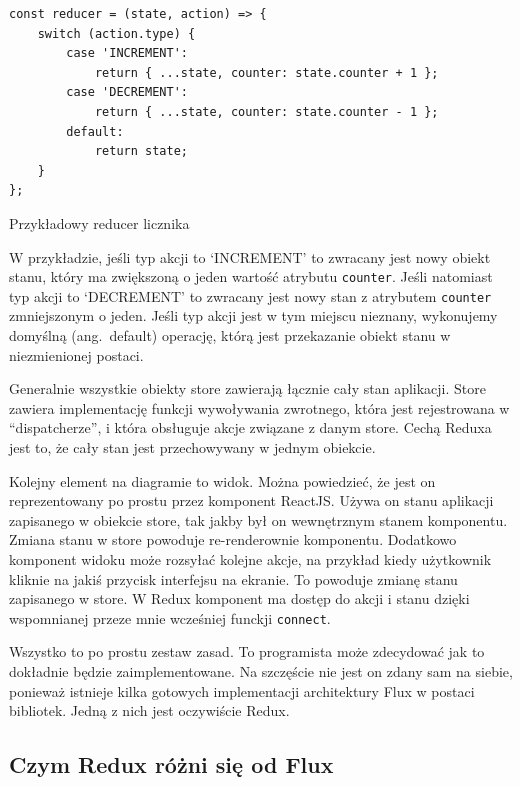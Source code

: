 \begin{listing}
\begin{verbatim}
const reducer = (state, action) => {
    switch (action.type) {
        case 'INCREMENT':
            return { ...state, counter: state.counter + 1 };
        case 'DECREMENT':
            return { ...state, counter: state.counter - 1 };
        default:
            return state;
    }
};
\end{verbatim}
\caption{Przykładowy reducer licznika} \label{listing:reducer}
\end{listing}

W przykładzie, jeśli typ akcji to `INCREMENT' to zwracany jest nowy obiekt stanu,
który ma zwiększoną o jeden wartość atrybutu \texttt{counter}.
Jeśli natomiast typ akcji to `DECREMENT' to zwracany jest nowy stan z atrybutem
\texttt{counter} zmniejszonym o jeden.
Jeśli typ akcji jest w tym miejscu nieznany, wykonujemy domyślną (ang.\ default) operację, którą jest
przekazanie obiekt stanu w niezmienionej postaci.

Generalnie wszystkie obiekty store zawierają łącznie cały stan aplikacji.
Store zawiera implementację funkcji wywoływania zwrotnego,
która jest rejestrowana w ``dispatcherze'', i która obsługuje akcje związane z danym store.
Cechą Reduxa jest to, że cały stan jest przechowywany w jednym obiekcie.

Kolejny element na diagramie to widok.
Można powiedzieć, że jest on reprezentowany po prostu przez komponent ReactJS\@.
Używa on stanu aplikacji zapisanego w obiekcie store, tak jakby był on wewnętrznym stanem komponentu.
Zmiana stanu w store powoduje re-renderownie komponentu.
Dodatkowo komponent widoku może rozsyłać kolejne akcje, na przykład kiedy użytkownik
kliknie na jakiś przycisk interfejsu na ekranie.
To powoduje zmianę stanu zapisanego w store.
W Redux komponent ma dostęp do akcji i stanu dzięki wspomnianej przeze mnie wcześniej funckji \texttt{connect}.

Wszystko to po prostu zestaw zasad.
To programista może zdecydować jak to dokładnie będzie zaimplementowane.
Na szczęście nie jest on zdany sam na siebie, ponieważ istnieje kilka gotowych
implementacji architektury Flux w postaci bibliotek.
Jedną z nich jest oczywiście Redux.
~\cite{www_nafrontendzie}

\subsection{Czym Redux różni się od Flux}


